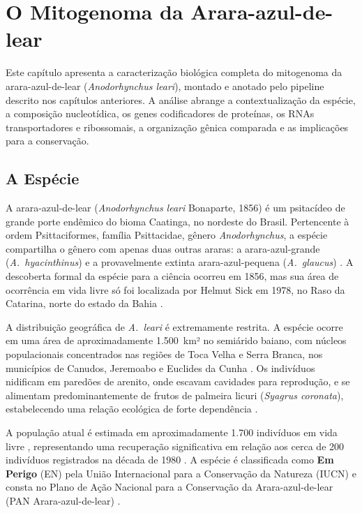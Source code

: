 
\chapter{O Mitogenoma da Arara-azul-de-lear}
\label{cap:mitogenoma}

Este capítulo apresenta a caracterização biológica completa do mitogenoma da arara-azul-de-lear (\textit{Anodorhynchus leari}), montado e anotado pelo pipeline descrito nos capítulos anteriores. A análise abrange a contextualização da espécie, a composição nucleotídica, os genes codificadores de proteínas, os RNAs transportadores e ribossomais, a organização gênica comparada e as implicações para a conservação.

\section{A Espécie}
\label{sec:especie}

A arara-azul-de-lear (\textit{Anodorhynchus leari} Bonaparte, 1856) é um psitacídeo de grande porte endêmico do bioma Caatinga, no nordeste do Brasil. Pertencente à ordem Psittaciformes, família Psittacidae, gênero \textit{Anodorhynchus}, a espécie compartilha o gênero com apenas duas outras araras: a arara-azul-grande (\textit{A.~hyacinthinus}) e a provavelmente extinta arara-azul-pequena (\textit{A.~glaucus}) \cite{collar1997}. A descoberta formal da espécie para a ciência ocorreu em 1856, mas sua área de ocorrência em vida livre só foi localizada por Helmut Sick em 1978, no Raso da Catarina, norte do estado da Bahia \cite{sick1979}.

A distribuição geográfica de \textit{A.~leari} é extremamente restrita. A espécie ocorre em uma área de aproximadamente 1.500~km² no semiárido baiano, com núcleos populacionais concentrados nas regiões de Toca Velha e Serra Branca, nos municípios de Canudos, Jeremoabo e Euclides da Cunha \cite{icmbio2022}. Os indivíduos nidificam em paredões de arenito, onde escavam cavidades para reprodução, e se alimentam predominantemente de frutos de palmeira licuri (\textit{Syagrus coronata}), estabelecendo uma relação ecológica de forte dependência \cite{sick1979,icmbio2022}.

A população atual é estimada em aproximadamente 1.700 indivíduos em vida livre \cite{icmbio2022}, representando uma recuperação significativa em relação aos cerca de 200 indivíduos registrados na década de 1980 \cite{sick1979,icmbio2022}. A espécie é classificada como \textbf{Em Perigo} (EN) pela União Internacional para a Conservação da Natureza (IUCN) e consta no Plano de Ação Nacional para a Conservação da Arara-azul-de-lear (PAN Arara-azul-de-lear) \cite{icmbio2022}.

